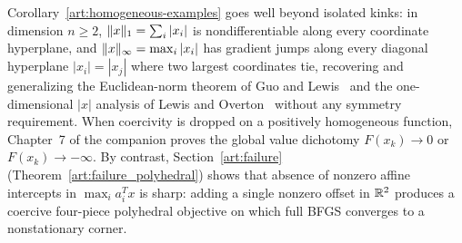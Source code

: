 Corollary~\ref{art:homogeneous-examples} goes well beyond isolated kinks: in
dimension $n\ge2$, $\lVert x\rVert_1=\sum_i|x_i|$ is nondifferentiable along every
coordinate hyperplane, and $\lVert x\rVert_\infty=\max_i|x_i|$ has gradient jumps
along every diagonal hyperplane $|x_i|=|x_j|$ where two largest coordinates tie,
recovering and generalizing the Euclidean-norm theorem of Guo and
Lewis~\cite[Corollary~4.2]{GL18} and the one-dimensional $|x|$ analysis of Lewis
and Overton~\cite[Section~5.1]{LO} without any symmetry requirement. When
coercivity is dropped on a positively homogeneous function, Chapter~7 of the
companion proves the global value dichotomy $F(x_k)\to0$ or $F(x_k)\to-\infty$.
By contrast, Section~\ref{art:failure} (Theorem~\ref{art:failure_polyhedral})
shows that absence of nonzero affine intercepts in $\max_ia_i^Tx$ is sharp:
adding a single nonzero offset in $\mathbb R^2$ produces a coercive four-piece
polyhedral objective on which full BFGS converges to a nonstationary corner.

